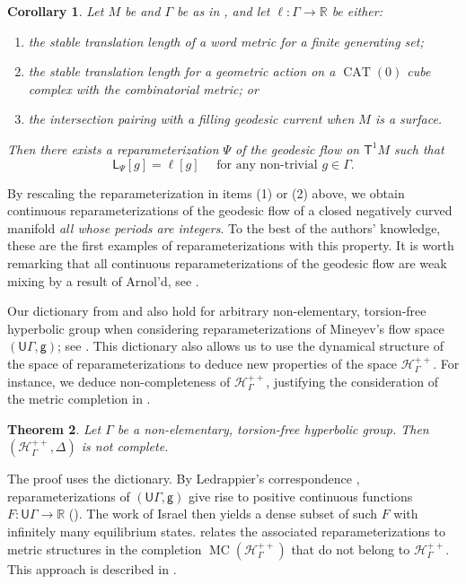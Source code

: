 \documentclass[twoside]{amsart}
\newtheorem{mainthm}{Theorem}
\newtheorem{corollarymain}[mainthm]{Corollary}
\theoremstyle{definition}
\numberwithin{equation}{section}
\numberwithin{theorem}{section}
\newcommand{\msf}[1]{\mathsf{#1}}
\newcommand{\R}{\mathbb{R}}
\newcommand{\scrH}{\mathscr{H}}
\newcommand{\G}{\Gamma}
\newcommand{\Del}{\Delta}
\DeclareMathOperator{\CAT}{CAT}
\newcommand{\bs}{\backslash}
\newcommand{\ra}{\rightarrow}
\newcommand{\UG}{\msf{U}\G}
\DeclareMathOperator{\MC}{MC}
\newcommand{\sfP}{\mathsf{\Psi}}
\begin{document}
\begin{corollarymain} \label{cor:combinatorial_examples}
   Let $M$ be and $\G$ be as in , and let $\ell:\G\ra \R$ be either:
   \begin{enumerate}
       \item the stable translation length of a word metric for a finite generating set;
       \item the stable translation length for a geometric action on a $\CAT(0)$ cube complex with the combinatorial metric; or
       \item the intersection pairing with a filling geodesic current when $M$ is a surface.
   \end{enumerate}
  Then there exists a reparameterization $\sfP$ of the geodesic flow on $\msf{T}^1M$ such that
   \[\msf{L}_{\sfP}[g]=\ell[g] \quad \text{ for any non-trivial }g\in \G.\]
\end{corollarymain}

By rescaling the reparameterization in items (1) or (2) above, we obtain continuous reparameterizations of the geodesic flow of a closed negatively curved manifold \emph{all whose periods are integers}. To the best of the authors' knowledge, these are the first examples of reparameterizations with this property. It is worth remarking that all continuous reparameterizations of the geodesic flow are weak mixing by a result of Arnol'd, see \cite[Section 23]{anosov}.

Our dictionary from  and  also hold for arbitrary non-elementary, torsion-free hyperbolic group when considering reparameterizations of Mineyev's flow space $(\UG,\msf{g})$; see . This dictionary also allows us to use the dynamical structure of the space of reparameterizations to deduce new properties of the space $\scrH_\G^{++}$.
For instance, we deduce non-completeness of $\scrH_\G^{++}$, justifying the consideration of the metric completion in .

\begin{mainthm}\label{thmmain.H_Gnotcomplete}
    Let $\G$ be a non-elementary, torsion-free hyperbolic group. Then $(\scrH^{++}_\G,\Del)$ is not complete. %
\end{mainthm}

The proof uses the dictionary. By Ledrappier's correspondence \cite{ledrappier,sambarino.report}, reparameterizations of $(\UG,\msf{g})$ give rise to positive continuous functions $F:\UG\ra \R$ (). The work of Israel \cite{israel,iommi-velozo} then yields a dense subset of such $F$ with infinitely many equilibrium states.   relates the associated reparameterizations to metric structures in the completion $\MC(\scrH_\G^{++})$ that do not belong to $\scrH_\G^{++}$. This approach is described in .
\end{document}
